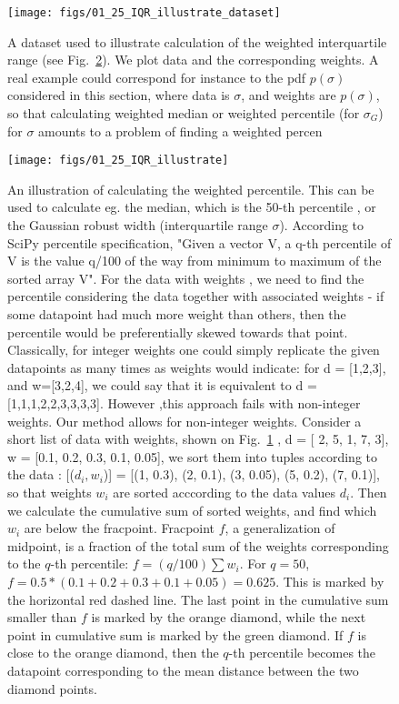 \documentclass[fleqn,usenatbib]{mnras}  %
\begin{document}
\begin{figure}
\texttt{[image: figs/01\_25\_IQR\_illustrate\_dataset]}
\caption{A dataset used to illustrate calculation of the weighted interquartile range (see Fig.~\ref{fig:iqr_plot}). We plot data and the corresponding weights.  A real example could correspond for instance to the pdf $p(\sigma)$ considered in this section, where data is $\sigma$, and weights are $p(\sigma)$, so that calculating weighted median or weighted percentile (for $\sigma_{G}$) for $\sigma$ amounts to a problem of finding a weighted percen}  
\label{fig:iqr_data}
\end{figure}

\begin{figure}
 \texttt{[image: figs/01\_25\_IQR\_illustrate]}
 \caption{An illustration of calculating the weighted percentile. This can be used to calculate eg. the median, which is the 50-th percentile , or the Gaussian robust width (interquartile range $\sigma$). According to SciPy percentile specification,  "Given a vector V, a q-th percentile of V is the value q/100 of the way from minimum to maximum of the sorted array V". For the data with weights , we need to find the percentile considering the data together with associated weights - if some datapoint had much more weight than others, then the percentile would be preferentially skewed towards that point. Classically, for integer weights one could simply replicate the given datapoints as many times as weights would indicate:   for  d = [1,2,3], and w=[3,2,4], we could say that it is equivalent to d = [1,1,1,2,2,3,3,3,3].  However ,this  approach fails with non-integer weights. Our method allows for non-integer weights. Consider a short list of data with weights, shown on Fig.~\ref{fig:iqr_data} , d = [  2,   5,   1,   7,    3],   w = [0.1, 0.2, 0.3, 0.1, 0.05],  we sort them into tuples according to the data : [($d_{i},w_{i}$)] = [(1, 0.3), (2, 0.1), (3, 0.05), (5, 0.2), (7, 0.1)],  so that weights $w_{i}$ are sorted acccording to the data values $d_{i}$.  Then we calculate the cumulative sum of sorted weights, and find which $w_{i}$  are below the fracpoint. Fracpoint  $f$, a generalization of midpoint,  is a fraction of the total sum of the weights corresponding to the $q$-th percentile:  $f = (q / 100) \sum{w_{i}}$. For $q=50$, $f = 0.5 * (0.1 + 0.2 + 0.3 +  0.1 +  0.05) = 0.625$. This is marked by the horizontal red dashed line. The last point in the cumulative sum smaller than $f$ is marked by the orange diamond, while the next point in cumulative sum is marked by the green diamond.  If $f$ is close to the orange diamond, then the $q$-th percentile becomes the datapoint corresponding to the mean distance between the two diamond points.}
 \label{fig:iqr_plot}
\end{figure}
\end{document}
